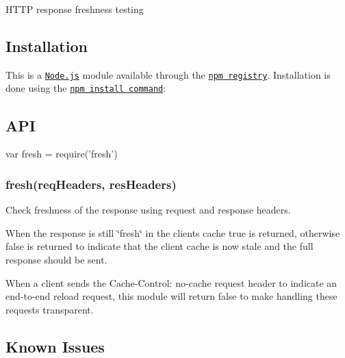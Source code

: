 \href{https://npmjs.org/package/fresh}{\tt } \href{https://npmjs.org/package/fresh}{\tt } \href{https://nodejs.org/en/}{\tt } \href{https://travis-ci.org/jshttp/fresh}{\tt } \href{https://coveralls.io/r/jshttp/fresh?branch=master}{\tt }

H\+T\+TP response freshness testing

\subsection*{Installation}

This is a \href{https://nodejs.org/en/}{\tt Node.\+js} module available through the \href{https://www.npmjs.com/}{\tt npm registry}. Installation is done using the \href{https://docs.npmjs.com/getting-started/installing-npm-packages-locally}{\tt {\ttfamily npm install} command}\+:




\subsection*{A\+PI}


\begin{DoxyCode}
var fresh = require('fresh')
\end{DoxyCode}


\subsubsection*{fresh(req\+Headers, res\+Headers)}

Check freshness of the response using request and response headers.

When the response is still \char`\"{}fresh\char`\"{} in the client\textquotesingle{}s cache {\ttfamily true} is returned, otherwise {\ttfamily false} is returned to indicate that the client cache is now stale and the full response should be sent.

When a client sends the {\ttfamily Cache-\/\+Control\+: no-\/cache} request header to indicate an end-\/to-\/end reload request, this module will return {\ttfamily false} to make handling these requests transparent.

\subsection*{Known Issues}

